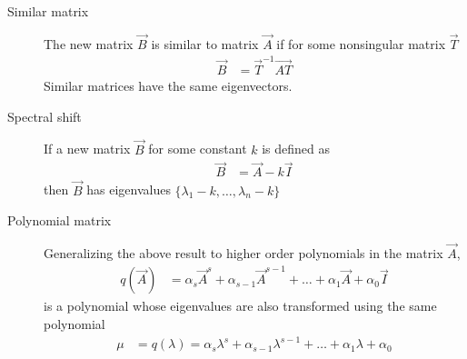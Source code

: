 \begin{description}
    \item[Similar matrix] The new matrix $ \vec{B} $ is similar to matrix $ \vec{A} $
        if for some nonsingular matrix $ \vec{T} $
        \begin{align}
            \vec{B} & = \vec{T}^{-1}\vec{AT}
        \end{align}
        Similar matrices have the same eigenvectors.

    \item[Spectral shift] If a new matrix $ \vec{B} $ for some constant $ k $ is defined
        as
        \begin{align}
            \vec{B} & = \vec{A} - k\vec{I}
        \end{align}
        then $ \vec{B} $ has eigenvalues $ \{\lambda_1 - k, \dots,\lambda_n - k\} $

    \item[Polynomial matrix] Generalizing the above result to higher order polynomials
        in the matrix $ \vec{A} $,
        \begin{align}
            q(\vec{A}) & = \alpha_s \vec{A}^s + \alpha_{s-1}\vec{A}^{s-1} + \dots
            + \alpha_1 \vec{A} + \alpha_0 \vec{I}
        \end{align}
        is a polynomial whose eigenvalues are also transformed using the same polynomial
        \begin{align}
            \mu & = q(\lambda) = \alpha_s\lambda^s + \alpha_{s-1}\lambda^{s-1}
            + \dots + \alpha_1\lambda + \alpha_0
        \end{align}


\end{description}
